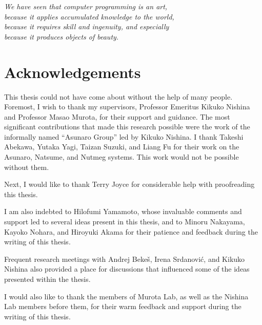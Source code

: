 

\begin{flushright}{\slshape
We have seen that computer programming is an art, \\
because it applies accumulated knowledge to the world, \\
because it requires skill and ingenuity, and especially \\
because it produces objects of beauty.} \\ \medskip
{}
\end{flushright}

\bigskip


\begingroup

\let\clearpage\relax
\let\cleardoublepage\relax
\let\cleardoublepage\relax

\chapter*{Acknowledgements} %

This thesis could not have come about without the help of many people.
Foremost, I wish to thank my supervisors, Professor Emeritus Kikuko Nishina and Professor Masao Murota, for their support and guidance.
The most significant contributions that made this research possible were the work of the informally named ``Asunaro Group'' led by Kikuko Nishina.
I thank Takeshi Abekawa, Yutaka Yagi, Taizan Suzuki, and Liang Fu for their work on the Asunaro, Natsume, and Nutmeg systems.
This work would not be possible without them.

Next, I would like to thank Terry Joyce for considerable help with proofreading this thesis.

I am also indebted to Hilofumi Yamamoto, whose invaluable comments and support led to several ideas present in this thesis, and to Minoru Nakayama, Kayoko Nohara, and Hiroyuki Akama for their patience and feedback during the writing of this thesis.

Frequent research meetings with Andrej Bekeš, Irena Srdanović, and Kikuko Nishina also provided a place for discussions that influenced some of the ideas presented within the thesis.

I would also like to thank the members of Murota Lab, as well as the Nishina Lab members before them, for their warm feedback and support during the writing of this thesis.

